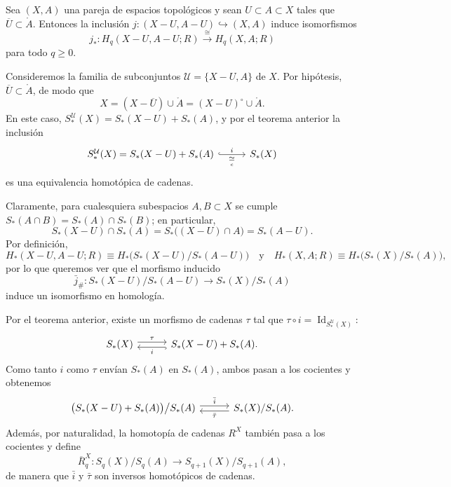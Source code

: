 \begin{coro}
Sea $(X, A)$ una pareja de espacios topológicos y sean $U \subset A \subset X$ tales que $\overline{U} \subset \mathring{A}$. Entonces la inclusión $j \colon (X - U, A - U) \hookrightarrow (X, A)$ induce isomorfismos
\[
j_* \colon H_q(X - U, A - U; R) \xrightarrow{\;\cong\;} H_q(X, A; R)
\]
para todo $q \geq 0$.
\end{coro}
\begin{dem}
Consideremos la familia de subconjuntos $\mathcal{U} = \{X - U, A\}$ de $X$. Por hipótesis, $\overline{U} \subset \mathring{A}$, de modo que
\[
X = (X - \overline{U}) \cup \mathring{A} = (X - U)^\circ \cup \mathring{A}.
\]
En este caso, $S_*^{\mathcal{U}}(X) = S_*(X - U) + S_*(A)$, y por el teorema anterior la inclusión
\[
\begin{tikzcd}[column sep=2.8em]
S_*^{\mathcal{U}}(X) = S_*(X - U) + S_*(A) \arrow[r, hook, "i", "\underset{c}{\simeq}"'] & S_*(X)
\end{tikzcd}
\]
es una equivalencia homotópica de cadenas.

Claramente, para cualesquiera subespacios $A, B \subset X$ se cumple $S_*(A \cap B) = S_*(A) \cap S_*(B)$; en particular,
\[
S_*(X - U) \cap S_*(A) = S_*\bigl((X - U) \cap A\bigr) = S_*(A - U).
\]
Por definición,
\[
H_*(X - U, A - U; R) \equiv H_*\bigl(S_*(X - U)/S_*(A - U)\bigr)
\quad \text{y} \quad
H_*(X, A; R) \equiv H_*\bigl(S_*(X)/S_*(A)\bigr),
\]
por lo que queremos ver que el morfismo inducido
\[
\bar{j}_\# \colon S_*(X - U)/S_*(A - U) \longrightarrow S_*(X)/S_*(A)
\]
induce un isomorfismo en homología.

Por el teorema anterior, existe un morfismo de cadenas $\tau$ tal que $\tau \circ i = \operatorname{Id}_{S_*^{\mathcal{U}}(X)}$:
\[
\begin{tikzcd}[column sep=3.0em]
S_*(X) \arrow[r, shift left=0.6ex, "\tau"] & S_*(X - U) + S_*(A). \arrow[l, hook, shift left=0.6ex, "i"]
\end{tikzcd}
\]
Como tanto $i$ como $\tau$ envían $S_*(A)$ en $S_*(A)$, ambos pasan a los cocientes y obtenemos
\[
\begin{tikzcd}[column sep=3.0em]
\bigl(S_*(X - U) + S_*(A)\bigr)\big/S_*(A) \arrow[r, shift left=0.6ex, "\bar{i}"] & S_*(X)/S_*(A). \arrow[l, shift left=0.6ex, "\bar{\tau}"]
\end{tikzcd}
\]
Además, por naturalidad, la homotopía de cadenas $R^X$ también pasa a los cocientes y define
\[
\overline{R}_q^X \colon S_q(X)/S_q(A) \longrightarrow S_{q+1}(X)/S_{q+1}(A),
\]
de manera que $\bar{i}$ y $\bar{\tau}$ son inversos homotópicos de cadenas.


\end{dem}
